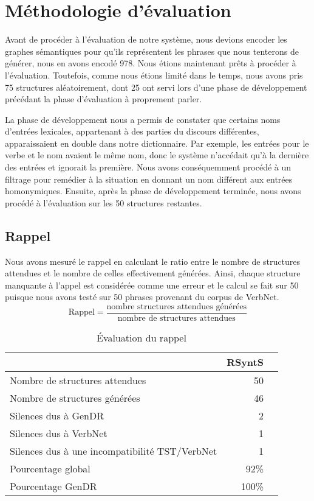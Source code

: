 \section{Méthodologie d'évaluation}

Avant de procéder à l'évaluation de notre système, nous devions encoder les graphes sémantiques pour qu'ils représentent les phrases que nous tenterons de générer, nous en avons encodé 978. Nous étions maintenant prêts à procéder à l'évaluation. Toutefois, comme nous étions limité dans le temps, nous avons pris 75 structures aléatoirement, dont 25 ont servi lors d'une phase de développement précédant la phase d'évaluation à proprement parler.

La phase de développement nous a permis de constater que certains noms d'entrées lexicales, appartenant à des parties du discours différentes, apparaissaient en double dans notre dictionnaire. Par exemple, les entrées pour le verbe  et le nom  avaient le même nom, donc le système n'accédait qu'à la dernière des entrées et ignorait la première. Nous avons conséquemment procédé à un filtrage pour remédier à la situation en donnant un nom différent aux entrées homonymiques. Ensuite, après la phase de développement terminée, nous avons procédé à l'évaluation sur les 50 structures restantes.
                              
\subsection{Rappel}
Nous avons mesuré le rappel en calculant le ratio entre le nombre de structures attendues et le nombre de celles effectivement générées. Ainsi, chaque structure manquante à l'appel est considérée comme une erreur et le calcul se fait sur 50 puisque nous avons testé sur 50 phrases provenant du corpus de VerbNet.
\[\text{Rappel} = \frac{\text{nombre structures attendues générées}}{\text{nombre de structures attendues}}\]

\begin{table}
\caption{Évaluation du rappel}
\begin{tabular}{lrr}
 \toprule
   & RSyntS\\
 \midrule
 Nombre de structures attendues   & 50\\
 Nombre de structures générées &  46\\
 Silences dus à GenDR & 2\\
 Silences dus à VerbNet    & 1\\
 Silences dus à une incompatibilité TST/VerbNet & 1\\
 \midrule
Pourcentage global & 92\% \\
Pourcentage GenDR & 100\% \\
\bottomrule
\end{tabular}
\end{table}

